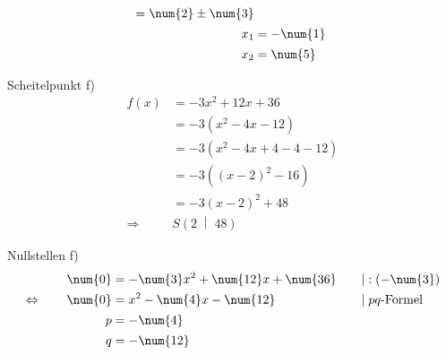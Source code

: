 \begin{exercise}
\begin{minipage}[t]{0.49\linewidth}
\begin{alignat*}{3}
          &
          &=\num{2}\pm\num{3}
          &
          \nomod
          \\
          \noeq
          &
          x_1&=-\num{1}
          &
          \nomod
          \\
          \noeq
          &
          x_2&=\num{5}
          &
          \nomod
        \end{alignat*}
      \endgroup
    \end{minipage}\bigskip\par
    \begin{minipage}[t]{0.49\linewidth}
      Scheitelpunkt f)
      \small
      \begin{equation*}
        \begin{split}
          f(x)&=-3x^2+12x+36
          \\
          &=-3\left(x^2-4x-12\right)
          \\
          &=-3\left(x^2-4x+4-4-12\right)
          \\
          &=-3\left((x-2)^2-16\right)
          \\
          &=-3(x-2)^2+48
          \\[1ex]
          \Rightarrow\quad&S\left(2\;\middle|\;48\right)
        \end{split}
      \end{equation*}
    \end{minipage}%
    \hfill
    \begin{minipage}[t]{0.49\linewidth}
      Nullstellen f)
      \small
      \begingroup
        \newcommand{\vstrut}{\vphantom{\left(f_0^0\right)}}%
        \newcommand{\noeq}{\phantom{\Leftrightarrow}\vstrut&\quad}%
        \newcommand{\iseq}{\Leftrightarrow\vstrut&\quad}%
        \newcommand{\impl}{\Rightarrow\vstrut&\quad}%
        \newcommand{\nomod}{\quad&\phantom{|}}%
        \newcommand{\domod}[1]{\quad&|#1}%
        \begin{alignat*}{3}
          \noeq
          &
          \num{0}&=-\num{3}x^{2}+\num{12}x+\num{36}
          &
          \domod{:(-\num{3})}
          \\
          \iseq
          &
          \num{0}&=x^{2}-\num{4}x-\num{12}
          &
          \domod{\;\text{$pq$-Formel}}
          \\
          \noeq
          &
          p&=-\num{4}
          &
          \nomod
          \\
          \noeq
          &
          q&=-\num{12}
          &

\end{alignat*}
\end{minipage}
\end{exercise}
